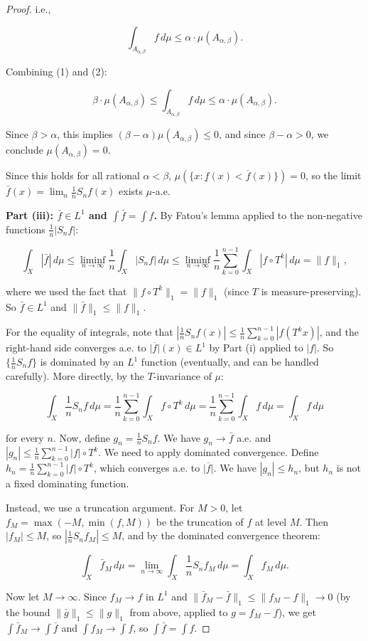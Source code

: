 \begin{proof}
i.e.,

\begin{equation}\label{eq:2}\tag{2}
\int_{A_{\alpha,\beta}} f \, d\mu \leq \alpha \cdot \mu(A_{\alpha,\beta}).
\end{equation}

Combining (1) and (2):

\[
\beta \cdot \mu(A_{\alpha,\beta}) \leq \int_{A_{\alpha,\beta}} f \, d\mu \leq \alpha \cdot \mu(A_{\alpha,\beta}).
\]

Since $\beta > \alpha$, this implies $(\beta - \alpha) \mu(A_{\alpha,\beta}) \leq 0$, and since $\beta - \alpha > 0$, we conclude $\mu(A_{\alpha,\beta}) = 0$.

Since this holds for all rational $\alpha < \beta$, $\mu(\{x : \underline{f}(x) < \overline{f}(x)\}) = 0$, so the limit $\bar{f}(x) = \lim_n \frac{1}{n} S_n f(x)$ exists $\mu$-a.e.

\textbf{Part (iii): $\bar{f} \in L^1$ and $\int \bar{f} = \int f$.} By Fatou's lemma applied to the non-negative functions $\frac{1}{n}|S_n f|$:

\[
\int_X |\bar{f}| \, d\mu \leq \liminf_{n \to \infty} \frac{1}{n} \int_X |S_n f| \, d\mu \leq \liminf_{n \to \infty} \frac{1}{n} \sum_{k=0}^{n-1} \int_X |f \circ T^k| \, d\mu = \|f\|_1,
\]

where we used the fact that $\|f \circ T^k\|_1 = \|f\|_1$ (since $T$ is measure-preserving). So $\bar{f} \in L^1$ and $\|\bar{f}\|_1 \leq \|f\|_1$.

For the equality of integrals, note that $|\frac{1}{n} S_n f(x)| \leq \frac{1}{n} \sum_{k=0}^{n-1} |f(T^k x)|$, and the right-hand side converges a.e. to $\overline{|f|}(x) \in L^1$ by Part (i) applied to $|f|$. So $\{\frac{1}{n}S_n f\}$ is dominated by an $L^1$ function (eventually, and can be handled carefully). More directly, by the $T$-invariance of $\mu$:

\[
\int_X \frac{1}{n} S_n f \, d\mu = \frac{1}{n} \sum_{k=0}^{n-1} \int_X f \circ T^k \, d\mu = \frac{1}{n} \sum_{k=0}^{n-1} \int_X f \, d\mu = \int_X f \, d\mu
\]

for every $n$. Now, define $g_n = \frac{1}{n} S_n f$. We have $g_n \to \bar{f}$ a.e. and $|g_n| \leq \frac{1}{n}\sum_{k=0}^{n-1} |f| \circ T^k$. We need to apply dominated convergence. Define $h_n = \frac{1}{n}\sum_{k=0}^{n-1} |f| \circ T^k$, which converges a.e. to $\overline{|f|}$. We have $|g_n| \leq h_n$, but $h_n$ is not a fixed dominating function.

Instead, we use a truncation argument. For $M > 0$, let $f_M = \max(-M, \min(f, M))$ be the truncation of $f$ at level $M$. Then $|f_M| \leq M$, so $|\frac{1}{n} S_n f_M| \leq M$, and by the dominated convergence theorem:

\[
\int_X \bar{f}_M \, d\mu = \lim_{n \to \infty} \int_X \frac{1}{n} S_n f_M \, d\mu = \int_X f_M \, d\mu.
\]

Now let $M \to \infty$. Since $f_M \to f$ in $L^1$ and $\|\bar{f}_M - \bar{f}\|_1 \leq \|f_M - f\|_1 \to 0$ (by the bound $\|\bar{g}\|_1 \leq \|g\|_1$ from above, applied to $g = f_M - f$), we get $\int \bar{f}_M \to \int \bar{f}$ and $\int f_M \to \int f$, so $\int \bar{f} = \int f$.
\end{proof}


